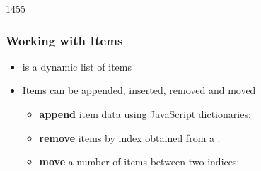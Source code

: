 \begin{slide}{1455}\frametitle{Working with Items}

\begin{itemize}
\item {} is a dynamic list of items
\item Items can be appended, inserted, removed and moved
  \begin{itemize}
  \item \textbf{append} item data using JavaScript dictionaries:\\
  \vspace*{0.25em}
  \begin{qml}
  \end{qml}
  \vspace*{0.5em}

  \item \textbf{remove} items by index obtained from a :\\
  \vspace*{0.25em}
  \begin{qml}
  \end{qml}
  \vspace*{0.5em}

  \item \textbf{move} a number of items between two indices:\\
  \vspace*{0.25em}
  \begin{qml}
  \\
  \end{qml}
  \end{itemize}
\end{itemize}

\end{slide}


